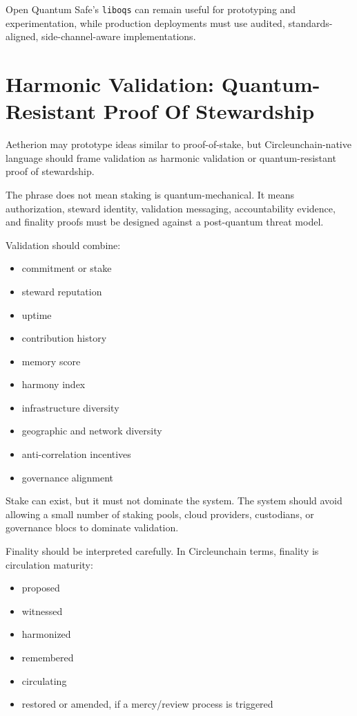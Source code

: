 ﻿\documentclass[12pt]{article}
\begin{document}
Open Quantum Safe's \texttt{liboqs} can remain useful for prototyping and experimentation, while production deployments must use audited, standards-aligned, side-channel-aware implementations.

\section{Harmonic Validation: Quantum-Resistant Proof Of Stewardship}


Aetherion may prototype ideas similar to proof-of-stake, but Circleunchain-native language should frame validation as harmonic validation or quantum-resistant proof of stewardship.

The phrase does not mean staking is quantum-mechanical. It means authorization, steward identity, validation messaging, accountability evidence, and finality proofs must be designed against a post-quantum threat model.

Validation should combine:

\begin{itemize}
  \item commitment or stake
  \item steward reputation
  \item uptime
  \item contribution history
  \item memory score
  \item harmony index
  \item infrastructure diversity
  \item geographic and network diversity
  \item anti-correlation incentives
  \item governance alignment
\end{itemize}

Stake can exist, but it must not dominate the system. The system should avoid allowing a small number of staking pools, cloud providers, custodians, or governance blocs to dominate validation.

Finality should be interpreted carefully. In Circleunchain terms, finality is circulation maturity:

\begin{itemize}
  \item proposed
  \item witnessed
  \item harmonized
  \item remembered
  \item circulating
  \item restored or amended, if a mercy/review process is triggered
\end{itemize}
\end{document}

